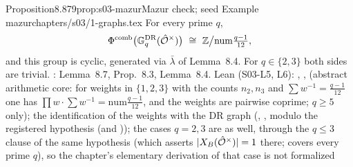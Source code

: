 \begin{quoted}{Proposition}{8.8}{79}{prop:s03-mazur}{Mazur check; seed Example mazur}{chapters/s03/1-graphs.tex}\label{rpt:prop:s03-mazur}
For every prime $q$,
\[\Phicomb\big(\GDR_q(\hat\cO^\times)\big)\ \cong\ \Z\big/\mathrm{num}\tfrac{q-1}{12},\]
and this group is cyclic, generated via $\bar\lambda$ of Lemma~8.4. For $q\in\{2,3\}$ both sides are trivial.
\stpmc: Lemma~8.7, Prop.~8.3, Lemma~8.4. Lean (S03-L5, L6):
, , 
\stformal{} (abstract arithmetic core: for weights in $\{1,2,3\}$ with the counts $n_2,n_3$ and $\sum w^{-1}=\frac{q-1}{12}$ one has
$\prod w\cdot\sum w^{-1}=\mathrm{num}\frac{q-1}{12}$, and the weights are pairwise coprime; $q\ge5$ only); the identification of the weights with the DR graph
(, , \stformal{} modulo the registered hypothesis  (and )); the cases $q=2,3$ are \stformal{} as well, through the $q\le3$ clause of the same hypothesis  (which asserts $|X_B(\hat{\mathcal{O}}^\times)|=1$ there;  covers every prime $q$), so the chapter's elementary derivation of that case is not formalized
\end{quoted}
